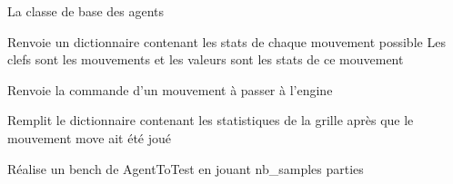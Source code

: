 \documentclass[letterpaper,10pt,french]{sphinxmanual}
\begin{document}
\begin{fulllineitems}
\label{\detokenize{index:agent.Agent}}
La classe de base des agents

\begin{fulllineitems}
\label{\detokenize{index:agent.Agent.allMovesStats}}
Renvoie un dictionnaire contenant les stats de chaque mouvement possible
Les clefs sont les mouvements et les valeurs sont les stats de ce mouvement

\end{fulllineitems}


\begin{fulllineitems}
\label{\detokenize{index:agent.Agent.commandFromMove}}
Renvoie la commande d’un mouvement à passer à l’engine

\end{fulllineitems}


\begin{fulllineitems}
\label{\detokenize{index:agent.Agent.getMoveStats}}
Remplit le dictionnaire contenant les statistiques de la grille
après que le mouvement move ait été joué

\end{fulllineitems}


\end{fulllineitems}


\begin{fulllineitems}
\label{\detokenize{index:agent.benchPlayer}}
Réalise un bench de AgentToTest en jouant nb\_samples parties

\end{fulllineitems}


\begin{fulllineitems}
\label{\detokenize{index:agent.getrandbits}}
\end{fulllineitems}
\end{document}
